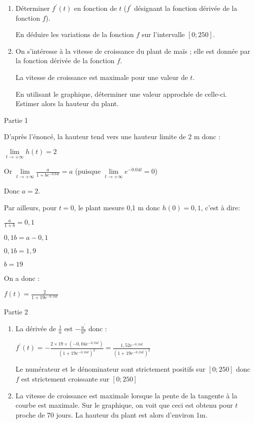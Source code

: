 \begin{enumerate}
     \item
     Déterminer $f^{\prime}\left(t\right)$ en fonction de $t$ ($f^{\prime}$ désignant la fonction dérivée de la fonction $f$).
     \par
     En déduire les variations de la fonction $f$ sur l'intervalle $\left[0 ; 250\right]$.
     \item
     On s'intéresse à la vitesse de croissance du plant de maïs  ; elle est donnée par la fonction dérivée de la fonction $f$.
     \par
     La vitesse de croissance est maximale pour une valeur de $t$.
     \par
     En utilisant le graphique, déterminer une valeur approchée de celle-ci. Estimer alors la hauteur du plant.
\end{enumerate}
\begin{corrige}
     \begin{h3}Partie 1\end{h3}
     D'après l'énoncé, la hauteur tend vers une hauteur limite de 2 m donc :
     \par
     $\lim\limits_{t\rightarrow +\infty }h\left(t\right)=2$
     \par
     Or $\lim\limits_{t\rightarrow +\infty }\frac{a}{1+be^{-0.04t}}=a$ (puisque $\lim\limits_{t\rightarrow +\infty }e^{-0.04t}=0$)
     \par
     Donc $a=2$.
     \par
     Par ailleurs, pour $t=0$, le plant mesure 0,1 m donc $h\left(0\right)=0,1$, c'est à dire:
     \par
     $\frac{a}{1+b}=0,1$
     \par
     $0,1b=a-0,1$
     \par
     $0,1b=1,9$
     \par
     $b=19$
     \par
     On a donc :
     \par
     $f\left(t\right)=\frac{2}{1+19e^{- 0,04t}}$
     \begin{h3}Partie 2\end{h3}
     \begin{enumerate}
          \item
          La dérivée de $\frac{1}{u}$ est $-\frac{u^{\prime}}{u^{2}}$ donc :
          \par
          $f^{\prime}\left(t\right)=-\frac{2\times 19\times \left(-0,04e^{-0,04t}\right)}{\left(1+19e^{- 0,04t}\right)^{2}}=\frac{1,52e^{-0,04t}}{\left(1+19e^{- 0,04t}\right)^{2}}$
          \par
          Le numérateur et le dénominateur sont strictement positifs sur $\left[0 ; 250\right]$ donc $f$ est strictement croissante sur $\left[0 ; 250\right]$
          \item
          La vitesse de croissance est maximale lorsque la pente de la tangente à la courbe est maximale. Sur le graphique, on voit que ceci est obtenu pour $t$ proche de 70 jours. La hauteur du plant est alors d'environ 1m.
     \end{enumerate}
\end{corrige}
